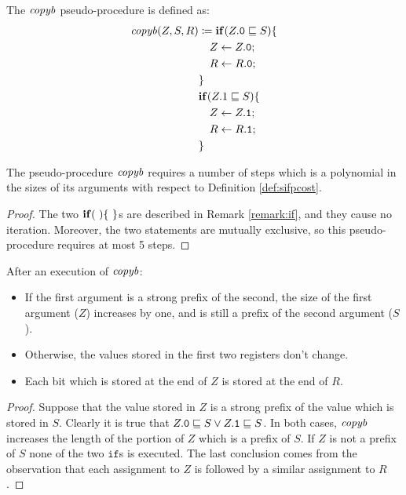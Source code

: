 \begin{defn}
  \label{def:copyb}
  The $\mathit{copyb}$ pseudo-procedure is defined as:
  \begin{align*}
  \mathit{copyb} (Z, S, R)&\coloneqq  \mathbf{if}(Z.\mathtt{0} \sqsubseteq S)\{\\
  & \quad Z \leftarrow Z.\mathtt{0};\\
  & \quad R \leftarrow R.\mathtt{0};\\
  & \}\\
  & \mathbf{if}(Z.1 \sqsubseteq S)\{\\
  & \quad Z \leftarrow Z.\mathtt{1};\\
  & \quad R \leftarrow R.\mathtt{1};\\
  & \}
  \end{align*}
\end{defn}

\begin{lemma}
\label{lemma:compcopyb}
The pseudo-procedure $\mathit{copyb}$ requires a number of steps which is a
polynomial in the sizes of its arguments with respect to Definition \ref{def:sifpcost}.
\end{lemma}

\begin{proof}
The two $\mathbf{if}(\ )\{\ \}$s are described in Remark \ref{remark:if},
 and they cause no iteration. Moreover,
 the two statements are mutually exclusive,
 so this pseudo-procedure requires at most 5 steps.
\end{proof}

\begin{lemma}
\label{lemma:corrcopyb}
After an execution of $\mathit{copyb}$:
\begin{itemize}
\item If the first argument is a strong prefix of the second,
the size of the first argument ($Z$) increases by one,
and is still a prefix of the second argument ($S$).
\item Otherwise, the values stored in the first two registers don't change.
\item Each bit which is stored at the end of $Z$ is stored at the end of $R$.
\end{itemize}
\end{lemma}

\begin{proof}
Suppose that the value stored in $Z$ is a strong prefix of the value which is stored in $S$. Clearly it is true that $Z.\mathtt{0} \sqsubseteq S \lor Z.\mathtt{1}\sqsubseteq S$. In both cases, $\mathit{copyb}$ increases the length of the portion of $Z$ which is a prefix of $S$. If $Z$ is not a prefix of $S$ none of the two $\mathtt{if}$s is executed. The last conclusion comes from the observation that each assignment to $Z$ is followed by a similar assignment to $R$.
\end{proof}




